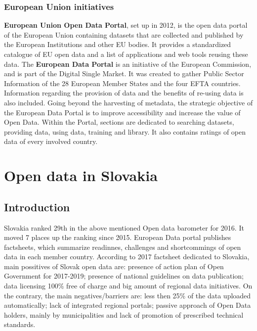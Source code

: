 \documentclass[thesis=B,english]{FITthesis}[2012/06/26]
\begin{document}
	\subsection{European Union initiatives}
\textbf{European Union Open Data Portal}, set up in 2012, is the open data portal of the European Union containing datasets that are collected and published by the European Institutions and other EU bodies. It provides a standardized catalogue of EU open data and a list of applications and web tools reusing these data. \cite{EUopendataportal}
\hspace{10000px}
The \textbf{European Data Portal} is an initiative of the European Commission, and is part of the Digital Single Market. It was created to gather Public Sector Information of the 28 European Member States and the four EFTA countries. Information regarding the provision of data and the benefits of re-using data is also included. Going beyond the harvesting of metadata, the strategic objective of the European Data Portal is to improve accessibility and increase the value of Open Data. Within the Portal, sections are dedicated to searching datasets, providing data, using data, training and library. It also contains ratings of open data of every involved country. \cite{eudataportal}

\chapter{Open data in Slovakia}
	\section{Introduction}
	Slovakia ranked 29th in the above mentioned Open data barometer for 2016. It moved 7 places up the ranking since 2015. European Data portal publishes factsheets, which summarize readinnes, challenges and shortcommings of open data in each member country. According to 2017 factsheet dedicated to Slovakia, main possitives of Slovak open data are: presence of action plan of Open Government for 2017-2019; presence of national guidelines on data publication; data licensing 100\% free of charge and big amount of regional data initiatives. On the contrary, the main negatives/barriers are: less then 25\% of the data uploaded automatically; lack of integrated regional portals; passive approach of Open Data holders, mainly by municipalities and lack of promotion of prescribed technical standards. \cite{eudataportalfactsheet}
\end{document}
